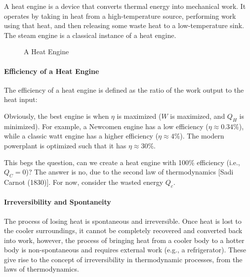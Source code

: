 \documentclass[11pt]{report}
\begin{document}
\begin{definition}
    A heat engine is a device that converts thermal energy into mechanical work. It operates by taking in heat from a high-temperature source, performing work using that heat, and then releasing some waste heat to a low-temperature sink. The steam engine is a classical instance of a heat engine.
\end{definition}
\begin{figure}[h!]
    \centering
    \caption{A Heat Engine}
\end{figure}

\paragraph{Efficiency of a Heat Engine} The efficiency of a heat engine is defined as the ratio of the work output to the heat input:

Obviously, the best engine is when $\eta$ is maximized ($W$ is maximized, and $Q_H$ is minimized). For example, a Newcomen engine has a low efficiency ($\eta \approx 0.34\%$), while a classic watt engine has a higher efficiency ($\eta \approx 4\%$). The modern powerplant is optimized such that it has $\eta \approx 30\%$.

This begs the question, can we create a heat engine with 100\% efficiency (i.e., $Q_C = 0$)? The answer is no, due to the second law of thermodynamics [Sadi Carnot (1830)]. For now, consider the wasted energy $Q_c$. 

\paragraph{Irreversibility and Spontaneity} The process of losing heat is spontaneous and irreversible. Once heat is lost to the cooler surroundings, it cannot be completely recovered and converted back into work, however, the process of bringing heat from a cooler body to a hotter body is non-spontaneous and requires external work (e.g., a refrigerator). These give rise to the concept of irreversibility in thermodynamic processes, from the laws of thermodynamics.
\end{document}
